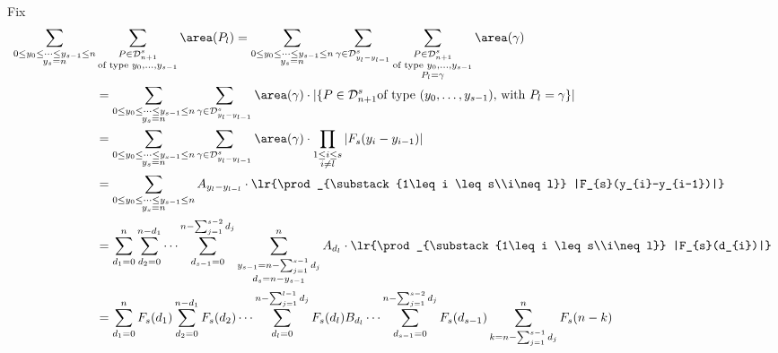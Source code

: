 \documentclass[12pt]{article}
\begin{document}
Fix  
\begin{align*}
    \sum_{\substack{0\leq y_{0}\leq \cdots\leq y_{s-1}\leq n\\y_{s}=n}}& \sum_{\substack{P\in \mathcal{D}_{n+1}^{s}\\\text{of type }y_{0},\ldots, y_{s-1}}} \area(P_{l}) = \sum_{\substack{0\leq y_{0}\leq \cdots\leq y_{s-1}\leq n\\y_{s}=n}}\sum_{\gamma\in \mathcal{D}_{y_{l}-y_{l-1}}^{s}} \sum_{\substack{P\in \mathcal{D}_{n+1}^{s}\\\text{of type }y_{0},\ldots, y_{s-1}\\P_{l}=\gamma}} \area(\gamma)\\
    &= \sum_{\substack{0\leq y_{0}\leq \cdots\leq y_{s-1}\leq n\\y_{s}=n}}\sum_{\gamma\in \mathcal{D}_{y_{l}-y_{l-1}}^{s}} \area(\gamma)\cdot|\{P\in \mathcal{D}_{n+1}^{s} \text{of type }(y_{0},\ldots, y_{s-1}),\,\text{with } P_{l}=\gamma\}|  \\
    &= \sum_{\substack{0\leq y_{0}\leq \cdots\leq y_{s-1}\leq n\\y_{s}=n}}\sum_{\gamma\in \mathcal{D}_{y_{l}-y_{l-1}}^{s}}  \area(\gamma)\cdot \prod_{\substack{1\leq i \leq s\\i\neq l}} |F_{s}(y_{i}-y_{i-1})| \\
    &=  \sum_{\substack{0\leq y_{0}\leq \cdots\leq y_{s-1}\leq n\\y_{s}=n}}A_{y_{l}-y_{l-l}} \cdot \lr{\prod_{\substack{1\leq i \leq s\\i\neq l}} |F_{s}(y_{i}-y_{i-1})|} \\
    &=  \sum_{d_{1} = 0}^{n}\sum_{d_{2}=0}^{n-d_{1}}\cdots\sum_{d_{s-1} = 0}^{n-\sum_{j=1}^{s-2}d_{j}}\sum_{\substack{y_{s-1}=n-\sum_{j=1}^{s-1}d_{j}\\d_{s}=n-y_{s-1}}}^{n}A_{d_{l}} \cdot \lr{\prod_{\substack{1\leq i \leq s\\i\neq l}} |F_{s}(d_{i})|} \\
    &=  \sum_{d_{1} = 0}^{n}F_{s}(d_{1})\sum_{d_{2}=0}^{n-d_{1}}F_{s}(d_{2})\cdots \sum_{d_{l} = 0}^{n-\sum_{j=1}^{l-1}d_{j}}F_{s}(d_{l}) B_{d_{l}}\cdots\sum_{d_{s-1} = 0}^{n-\sum_{j=1}^{s-2}d_{j}}F_{s}(d_{s-1})\sum_{\substack{k=n-\sum_{j=1}^{s-1}d_{j}}}^{n}F_{s}(n-k) 
\end{align*}
\end{document}
